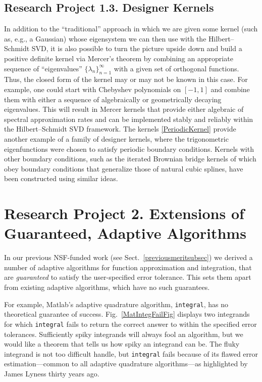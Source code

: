\documentclass[11pt]{NSFamsart}
\newcommand{\Matlab}{{\sc Matlab}\xspace}
\begin{document}
\subsection*{Research Project 1.3. Designer Kernels}\label{SectDesignerKernels}
In addition to the ``traditional'' approach in which we are given some kernel (such as, e.g., a Gaussian) whose eigensystem we can then use with the Hilbert--Schmidt SVD, it is also possible to turn the picture upside down and build a positive definite kernel via Mercer's theorem by combining an appropriate sequence of
``eigenvalues'' $\{\lambda_n\}_{n=1}^\infty$ with a given set of orthogonal functions. Thus, the closed form of the kernel may or may not be known in this case. For example, one could start with Chebyshev polynomials on $[-1,1]$ and combine them with either a sequence of algebraically or geometrically decaying eigenvalues. This will result in Mercer kernels that provide either algebraic of spectral approximation rates and can be implemented stably and reliably within the Hilbert--Schmidt SVD framework. The kernels \eqref{PeriodicKernel} provide another example of a family of designer kernels, where the trigonometric eigenfunctions were chosen to satisfy periodic boundary conditions. Kernels with other boundary conditions, such as the iterated Brownian bridge kernels of \cite{CavorettoEtAl14} which obey boundary conditions that generalize those of natural cubic splines, have been constructed using similar ideas.

\section*{Research Project 2. Extensions of Guaranteed, Adaptive Algorithms}\label{SectGAIL}

In our previous NSF-funded work (see Sect.\ \ref{previousmeritsubsec}) we derived a number of  adaptive algorithms for function approximation and integration, that are \emph{guaranteed} to satisfy the user-specified error tolerance.  This sets them apart from existing adaptive algorithms, which have no such guarantees.

For example, \Matlab's adaptive quadrature algorithm, \texttt{integral}, has no theoretical guarantee of success. Fig.\ \ref{MatIntegFailFig} displays two integrands for which \texttt{integral} fails to return the correct answer to within the specified error tolerances.  Sufficiently spiky integrands will always fool an algorithm, but we would like a theorem that tells us how spiky an integrand can be.  The fluky integrand is not too difficult handle, but \texttt{integral} fails because of its flawed error estimation---common to all adaptive quadrature algorithms---as highlighted by James Lyness \cite{Lyn83} thirty years ago.
\end{document}
